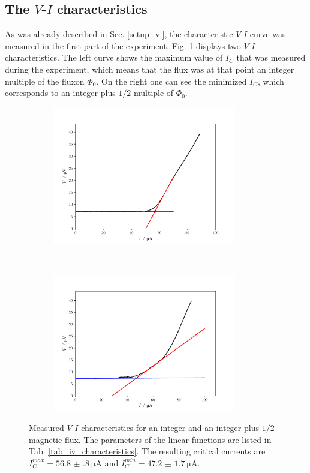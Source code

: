 \documentclass[a4paper,10pt]{article}
\begin{document}
\subsection{The $V$-$I$ characteristics}
As was already described in Sec. \ref{setup_vi}, the characteristic $V$-$I$ curve was measured in the first part of the experiment. Fig. \ref{fig_iv_characteristics} displays two $V$-$I$ characteristics. The left curve shows the maximum value of $I_C$ that was measured during the experiment, which means that the flux was at that point an integer multiple of the fluxon $\Phi_0$. On the right one can see the minimized $I_C$, which corresponds to an integer plus $1/2$ multiple of $\Phi_0$. 
\begin{figure}[htp!]
    \centering
    \begin{subfigure}[t]{0.45 \textwidth}
        \centering
        \includegraphics[height=6cm]{iv_max.pdf}
        \caption{ }
    \end{subfigure}
    ~ 
    \begin{subfigure}[t]{0.45 \textwidth}
        \centering
        \includegraphics[height=6cm]{iv_min.pdf}
        \caption{ }
    \end{subfigure}
    \caption{Measured $V$-$I$ characteristics for an integer and an integer plus $1/2$ magnetic flux. The parameters of the linear functions are listed in Tab. \ref{tab_iv_characteristics}. The resulting critical currents are $I_C^{max} = \SI{56.8(8)}{\micro \ampere}$ and $I_C^{min} = \SI{47.2(17)}{\micro \ampere}$. }
    \label{fig_iv_characteristics}
\end{figure}
\end{document}
